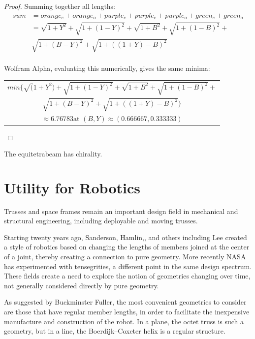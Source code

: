 \documentclass[11pt]{article}
\begin{document}
\begin{proof}
  Summing together all lengths:
  \begin{align*}
  sum &= orange_e + orange_o + purple_e + purple_e + purple_o + green_e + green_o \\    
  &= \sqrt{1 + Y^2} + \sqrt{1 + (1-Y)^2} + \sqrt{1 + B^2} + \sqrt{1+ (1-B)^2} + \\
  & \sqrt{1 + (B - Y)^2} +  \sqrt{1 + ((1+Y) - B)^2} \\
  \end{align*} 

  Wolfram Alpha, evaluating this numerically, gives the same minima:
  
  \begin{tabular}{c}    
$  min\{\sqrt(1 + Y^2) + \sqrt{1 + (1 - Y)^2} + \sqrt{1 + B^2} + \sqrt{1 + (1 - B)^2} + $\\
    $  \sqrt{1 + (B - Y)^2} + \sqrt{1 + ((1 + Y) - B)^2}\} $ \\
    $ \approx 6.76783 \text{at } (B, Y) \approx (0.666667, 0.333333) $
  \end{tabular}

  
\end{proof}

The equitetrabeam has chirality.

\section{Utility for Robotics}

Trusses and space frames remain an important design field in mechanical and structural engineering\cite{mikulas1985sequentially},
including deployable and moving trusses\cite{claypool2012readily}.

Starting twenty years ago, Sanderson\cite{sanderson1996modular}, Hamlin,\cite{TetrobotBook}, and others including Lee\cite{lee2002dynamic}
created a style of robotics based on changing the lengths of members
joined at the center of a joint, thereby creating a connection to pure geometry. More recently NASA has experimented with
tensegrities\cite{NTRT}, a different point in the same design spectrum. These fields create a need to explore the notion of
geometries changing over time, not generally considered directly by pure geometry.

As suggested by Buckminster Fuller, the most convenient geometries to consider are those that have regular member
lengths, in order to facilitate the inexpensive manufacture and construction of the robot.  In a plane, the octet truss
is such a geometry, but in a line, the Boerdijk--Coxeter helix is a regular structure.
\end{document}
